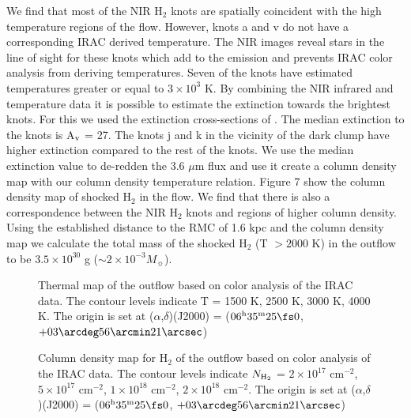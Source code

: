 \documentclass[iop]{emulateapj}
\begin{document}
We find that most of the NIR H$_2$ knots are spatially coincident with
the high temperature regions of the flow.  However, knots a and v  do not
have a corresponding IRAC derived temperature. The NIR images reveal stars in the line of sight
for these knots which add to the emission and prevents IRAC color analysis from deriving
temperatures. 
Seven of the knots have estimated temperatures greater or equal to  $3 \times 10^{3}$ K. 
By combining the NIR infrared and temperature data it is possible to
estimate the extinction towards the brightest knots. For this we used the extinction 
cross-sections of \citet{wei2001}.  The median extinction to the knots is A$_{\rm{v}}$ = 27.  The
knots j and k in the vicinity of the dark clump have higher extinction
compared to the rest of the knots. We use the median extinction value
to de-redden the 3.6 $\mu$m flux and use it create a column density
map with our column density temperature relation. 
Figure 7 show the
column density map of shocked H$_2$ in the flow. We find that there is
also a correspondence between the NIR H$_2$ knots and regions of
higher column density. Using the established distance to the RMC of 1.6 kpc and the 
column density map we calculate the total mass of the shocked H$_2$ 
(T $> 2000$ K) in the 
outflow to be $3.5 \times 10^{30}$ g ($\sim 2 \times 10^{-3} M_{\sun}$). 


\begin{figure*}
\caption{Thermal map of the outflow based on color analysis of the IRAC 
data. The contour levels indicate T = 1500 K, 2500 K, 3000 K, 4000 K.
The origin is set at 
($\alpha$,$\delta$)(J2000) =
($06^{\rm{h}}35^{\rm{m}}25\fs 0$, $+03\arcdeg56\arcmin21\arcsec$)
}
\end{figure*}

\begin{figure*}
\caption{Column density map for H$_2$ of the outflow based on color 
analysis of the IRAC 
data. The contour levels indicate 
$N_{\rm{H}_{2}}$ = 
$2\times10^{17}$ cm$^{-2}$, 
$5\times10^{17}$ cm$^{-2}$,
$1\times10^{18}$ cm$^{-2}$,
$2\times10^{18}$ cm$^{-2}$.
The origin is set at 
($\alpha$,$\delta$)(J2000) =
($06^{\rm{h}}35^{\rm{m}}25\fs 0$, $+03\arcdeg56\arcmin21\arcsec$)
}
\end{figure*}
\end{document}
